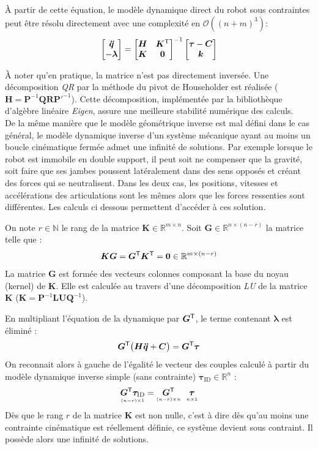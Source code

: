À partir de cette équation, le modèle dynamique direct
du robot sous contraintes peut être résolu directement avec
une complexité en $\mathcal{O}((n+m)^3)$:
$$
\begin{bmatrix}
    \bm{\ddot{q}} \\
    -\bm{\lambda} \\
\end{bmatrix}
=
\begin{bmatrix}
    \bm{H} & \bm{K}^{\mathsf{T}} \\
    \bm{K} & \bm{0} \\
\end{bmatrix}^{-1}
\begin{bmatrix}
    \bm{\tau} - \bm{C} \\
    \bm{k} \\
\end{bmatrix}
$$

À noter qu'en pratique, la matrice n'est pas directement inversée.
Une décomposition \textit{QR} par la méthode du pivot de Householder
est réalisée ($\bm{H} = \bm{P}^{-1}\bm{Q}\bm{R}\bm{P'}^{-1}$).
Cette décomposition, implémentée par la bibliothèque d'algèbre 
linéaire \textit{Eigen}, assure une meilleure stabilité 
numérique des calculs.\\

De la même manière que le modèle géométrique inverse 
est mal défini dans le cas général, le modèle dynamique inverse
d'un système mécanique ayant au moins un boucle cinématique fermée 
admet une infinité de solutions.
Par exemple lorsque le robot est immobile en double support, 
il peut soit ne compenser que la gravité, soit faire que ses
jambes poussent latéralement dans des sens opposés et créant 
des forces qui se neutralisent.
Dans les deux cas, les positions, vitesses et accélérations
des articulations sont les mêmes alors que les forces ressenties 
sont différentes.
Les calculs ci dessous permettent d'accéder à ces solution.

On note $r \in \mathbb{N}$ le rang de la matrice $\bm{K} \in \mathbb{R}^{m \times n}$.
Soit $\bm{G} \in \mathbb{R}^{n \times (n-r)}$ la matrice telle que : 
$$
\bm{K}\bm{G} = \bm{G}^{\mathsf{T}}\bm{K}^{\mathsf{T}} = \bm{0} \in \mathbb{R}^{m \times (n-r)}
$$
La matrice $\bm{G}$ est formée des vecteurs colonnes composant 
la base du noyau (kernel) de $\bm{K}$.
Elle est calculée au travers d'une décomposition
\textit{LU} de la matrice $\bm{K}$ ($\bm{K} = \bm{P}^{-1}\bm{L}\bm{U}\bm{Q}^{-1}$).

En multipliant l'équation de la dynamique par $\bm{G}^{\mathsf{T}}$, 
le terme contenant $\bm{\lambda}$ est éliminé :
$$
\bm{G}^{\mathsf{T}} \big(\bm{H}\bm{\ddot{q}} + \bm{C}\big) = \bm{G}^{\mathsf{T}} \bm{\tau}
$$
On reconnait alors à gauche de l'égalité le vecteur des couples 
calculé à partir du modèle dynamique inverse simple (sans contrainte) 
$\bm{\tau}_{\text{ID}} \in \mathbb{R}^{n}$ : 
$$
\underset{\scriptscriptstyle (n-r) \times 1}{\bm{G}^{\mathsf{T}} \bm{\tau}_{\text{ID}}}
= 
\underset{\scriptscriptstyle (n-r) \times n}{\bm{G}^{\mathsf{T}}} ~~
\underset{\scriptscriptstyle n \times 1}{\bm{\tau}}
$$
Dès que le rang $r$ de la matrice $\bm{K}$ est non nulle, c'est à dire
dès qu'au moins une contrainte cinématique est réellement définie, ce système
devient sous contraint. Il possède alors une infinité de solutions.

